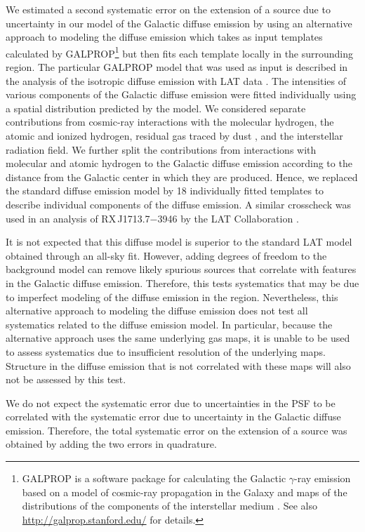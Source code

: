 \documentclass[12pt,preprint]{aastex}
\begin{document}
We estimated a second systematic error on the extension of a source
due to uncertainty in our model of the Galactic diffuse emission by
using an alternative 
approach to modeling the diffuse emission
which takes as input templates
calculated by
GALPROP\footnote{GALPROP is a software package for calculating the
Galactic $\gamma$-ray emission based on a model of cosmic-ray propagation
in the Galaxy and maps of the distributions of the 
components of the interstellar medium \citep{galprop1998,galprop2011}. 
See also \url{http://galprop.stanford.edu/} for details.} 
but then fits each template locally in
the surrounding region.
The particular GALPROP model that was used as input is described in
the analysis of the isotropic diffuse
emission with LAT data \citep{isotropic_lat}.  
The intensities of various components
of the Galactic diffuse emission were fitted individually using a
spatial distribution predicted by
the model.  
We considered separate contributions from
cosmic-ray interactions with the
molecular hydrogen, the atomic and ionized hydrogen, residual gas traced
by dust \citep{isabelle_dark_gass}, and the interstellar radiation
field. We further split the contributions from interactions with molecular
and atomic hydrogen to the Galactic diffuse emission according to the
distance from the Galactic center in which they are produced. Hence, we
replaced the standard diffuse emission model by 18 individually fitted
templates to describe individual components of the diffuse emission.
A similar crosscheck was used in an analysis of RX\,J1713.7$-$3946 
by the LAT Collaboration \citep{rx_j1713_lat}.

It is not expected that this diffuse model is superior to the standard
LAT model obtained through an all-sky fit.  However, adding degrees of
freedom to the background model can remove likely spurious sources that
correlate with features in the Galactic diffuse emission.  Therefore,
this tests systematics that may be due to imperfect modeling of the
diffuse emission in the region. 
Nevertheless, this alternative approach to modeling the diffuse emission
does not test all systematics related to the diffuse emission model. In
particular, because the alternative approach uses the same underlying gas
maps, it is unable to be used to assess systematics due to insufficient
resolution of the underlying maps. Structure in the diffuse emission that
is not correlated with these maps will also not be assessed by this test.

We do not expect the systematic error due to uncertainties in the PSF
to be correlated with the systematic error due to uncertainty in the
Galactic diffuse emission. Therefore, the total systematic error on the
extension of a source was obtained by adding the two errors in quadrature.
\end{document}
